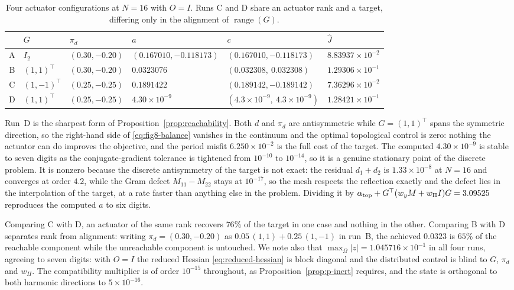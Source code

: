 \documentclass{article}
\DeclareMathOperator{\range}{range}
\begin{document}
\begin{table}[htbp]
\centering
\begin{tabular}{clllll}
\toprule
 & $G$ & $\pi_{d}$ & $a$ & $c$ & $\widehat J$\\
\midrule
A & $I_{2}$ & $(0.30,-0.20)$ & $(0.167010,-0.118173)$
  & $(0.167010,-0.118173)$ & $8.83937\times10^{-2}$\\
B & $(1,1)^{\top}$ & $(0.30,-0.20)$ & $0.0323076$
  & $(0.032308,\ 0.032308)$ & $1.29306\times10^{-1}$\\
C & $(1,-1)^{\top}$ & $(0.25,-0.25)$ & $0.1891422$
  & $(0.189142,-0.189142)$ & $7.36296\times10^{-2}$\\
D & $(1,1)^{\top}$ & $(0.25,-0.25)$ & $4.30\times10^{-9}$
  & $(4.3\times10^{-9},\ 4.3\times10^{-9})$
  & $1.28421\times10^{-1}$\\
\bottomrule
\end{tabular}
\caption{Four actuator configurations at $N=16$ with $O=I$. Runs C and D share
an actuator rank and a target, differing only in the alignment of
$\range(G)$.}
\label{tab:fig8-runs}
\end{table}

Run~D is the sharpest form of Proposition~\ref{prop:reachability}. Both $d$
and $\pi_{d}$ are antisymmetric while $G=(1,1)^{\top}$ spans the symmetric
direction, so the right-hand side of \eqref{eq:fig8-balance} vanishes in the
continuum and the optimal topological control is zero: nothing the actuator
can do improves the objective, and the period misfit $6.250\times10^{-2}$ is
the full cost of the target. The computed $4.30\times10^{-9}$ is stable to
seven digits as the conjugate-gradient tolerance is tightened from $10^{-10}$
to $10^{-14}$, so it is a genuine stationary point of the discrete problem. It
is nonzero because the discrete antisymmetry of the target is not exact: the
residual $d_{1}+d_{2}$ is $1.33\times10^{-8}$ at $N=16$ and converges at order
$4.2$, while the Gram defect $M_{11}-M_{22}$ stays at $10^{-17}$, so the mesh
respects the reflection exactly and the defect lies in the interpolation of
the target, at a rate faster than anything else in the problem. Dividing it by
$\alpha_{\rm top}+G^{\top}(w_{y}M+w_{\Pi}I)G=3.09525$ reproduces the computed
$a$ to six digits.

Comparing C with D, an actuator of the same rank recovers $76\%$ of the target
in one case and nothing in the other. Comparing B with D separates rank from
alignment: writing $\pi_{d}=(0.30,-0.20)$ as $0.05\,(1,1)+0.25\,(1,-1)$ in
run~B, the achieved $0.0323$ is $65\%$ of the reachable component while the
unreachable component is untouched. We note also that
$\max_{\Omega}|z|=1.045716\times10^{-1}$ in all four runs, agreeing to seven
digits: with $O=I$ the reduced Hessian \eqref{eq:reduced-hessian} is block
diagonal and the distributed control is blind to $G$, $\pi_{d}$ and $w_{\Pi}$.
The compatibility multiplier is of order $10^{-15}$ throughout, as
Proposition~\ref{prop:p-inert} requires, and the state is orthogonal to both
harmonic directions to $5\times10^{-16}$.
\end{document}

